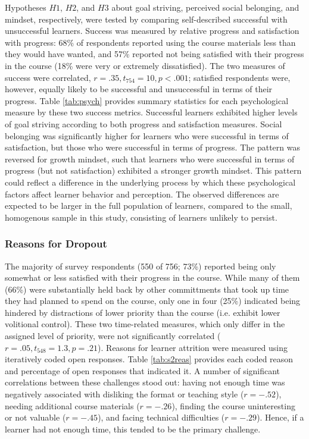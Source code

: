 \documentclass{sigchi}\usepackage[]{graphicx}\usepackage[]{color}
\begin{document}
Hypotheses $H1$, $H2$, and $H3$ about goal striving, perceived social belonging, and mindset, respectively, were tested by comparing self-described successful with unsuccessful learners. Success was measured by relative progress and satisfaction with progress: 68\% of respondents reported using the course materials less than they would have wanted, and 57\% reported not being satisfied with their progress in the course (18\% were very or extremely dissatisfied). The two measures of success were correlated, $r=.35, t_{754}=10, p<.001$; satisfied respondents were, however, equally likely to be successful and unsuccessful in terms of their progress. Table \ref{tab:psych} provides summary statistics for each psychological measure by these two success metrics. Successful learners exhibited higher levels of goal striving according to both progress and satisfaction measures. Social belonging was significantly higher for learners who were successful in terms of satisfaction, but those who were successful in terms of progress. The pattern was reversed for growth mindset, such that learners who were successful in terms of progress (but not satisfaction) exhibited a stronger growth mindset. This pattern could reflect a difference in the underlying process by which these psychological factors affect learner behavior and perception. The observed differences are expected to be larger in the full population of learners, compared to the small, homogenous sample in this study, consisting of learners unlikely to persist.  


\subsubsection{Reasons for Dropout}

The majority of survey respondents (550 of 756; 73\%) reported being only somewhat or less satisfied with their progress in the course. While many of them (66\%) were substantially held back by other committments that took up time they had planned to spend on the course, only one in four (25\%) indicated being hindered by distractions of lower priority than the course (i.e. exhibit lower volitional control). These two time-related measures, which only differ in the assigned level of priority, were not significantly correlated ($r=.05, t_{548}=1.3, p=.21$). Reasons for learner attrition were measured using iteratively coded open responses. Table \ref{tab:s2reas} provides each coded reason and percentage of open responses that indicated it. A number of significant correlations between these challenges stood out: having not enough time was negatively associated with disliking the format or teaching style ($r=-.52$), needing additional course materials ($r=-.26$), finding the course uninteresting or not valuable ($r=-.45$), and facing technical difficulties ($r=-.29$). Hence, if a learner had not enough time, this tended to be the primary challenge.
\end{document}

